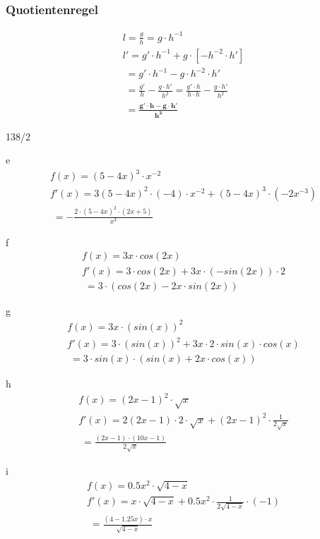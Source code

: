 \subsubsection{Quotientenregel}
\begin{gather*}
  l = \frac{g}{h} = g \cdot h^{-1} \\
  l' = g' \cdot h^{-1} + g \cdot [-h^{-2} \cdot h'] \\
  \;= g' \cdot h^{-1} - g \cdot h^{-2} \cdot h' \\
  \;= \frac{g'}{h} - \frac{g \cdot h'}{h^2} = \frac{g' \cdot h}{h \cdot h} - \frac{g \cdot h'}{h^2} \\
  \;= \boldsymbol{\frac{g' \cdot h - g \cdot h'}{h^2}}
\end{gather*}
\begin{exercise}{138/2}
  \item [e]
  \begin{gather*}
    f(x) = (5 - 4x)^3 \cdot x^{-2} \\
    f'(x) = 3(5 - 4x)^2 \cdot (-4) \cdot x^{-2} + (5 - 4x)^3 \cdot (-2x^{-3}) \\
    \;= -\frac{2 \cdot (5 - 4x)^2 \cdot (2x + 5)}{x^3}
  \end{gather*}
  \item [f]
  \begin{gather*}
    f(x) = 3x \cdot cos(2x) \\
    f'(x) = 3 \cdot cos(2x) + 3x \cdot (-sin(2x)) \cdot 2 \\
    \;= 3 \cdot (cos(2x) - 2x \cdot sin(2x))
  \end{gather*}
  \item [g]
  \begin{gather*}
    f(x) = 3x \cdot (sin(x))^2 \\
    f'(x) = 3 \cdot (sin(x))^2 + 3x \cdot 2 \cdot sin(x) \cdot cos(x) \\
    \;= 3 \cdot sin(x) \cdot (sin(x) + 2x \cdot cos(x))
  \end{gather*}
  \item [h]
  \begin{gather*}
    f(x) = (2x - 1)^2 \cdot \sqrt{x} \\
    f'(x) = 2(2x - 1) \cdot 2 \cdot \sqrt{x} + (2x - 1)^2 \cdot \frac{1}{2\sqrt{x}} \\
    \;= \frac{(2x - 1) \cdot (10x - 1)}{2\sqrt{x}}
  \end{gather*}
  \item [i]
  \begin{gather*}
    f(x) = 0.5x^2 \cdot \sqrt{4 - x} \\
    f'(x) = x \cdot \sqrt{4 - x} + 0.5x^2 \cdot \frac{1}{2\sqrt{4 - x}} \cdot (-1) \\
    \;= \frac{(4 - 1.25x) \cdot x}{\sqrt{4 - x}}
  \end{gather*}
\end{exercise}
